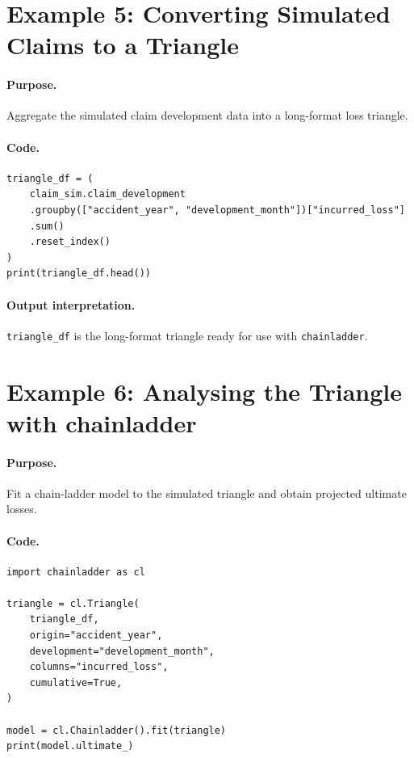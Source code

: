 \section{Example 5: Converting Simulated Claims to a Triangle}

\paragraph{Purpose.} Aggregate the simulated claim development data
into a long-format loss triangle.

\paragraph{Code.}
\begin{lstlisting}[style=pythonstyle]
triangle_df = (
    claim_sim.claim_development
    .groupby(["accident_year", "development_month"])["incurred_loss"]
    .sum()
    .reset_index()
)
print(triangle_df.head())
\end{lstlisting}

\paragraph{Output interpretation.} \texttt{triangle\_df} is the
long-format triangle ready for use with \texttt{chainladder}.

\section{Example 6: Analysing the Triangle with chainladder}

\paragraph{Purpose.} Fit a chain-ladder model to the simulated
triangle and obtain projected ultimate losses.

\paragraph{Code.}
\begin{lstlisting}[style=pythonstyle]
import chainladder as cl

triangle = cl.Triangle(
    triangle_df,
    origin="accident_year",
    development="development_month",
    columns="incurred_loss",
    cumulative=True,
)

model = cl.Chainladder().fit(triangle)
print(model.ultimate_)
\end{lstlisting}

